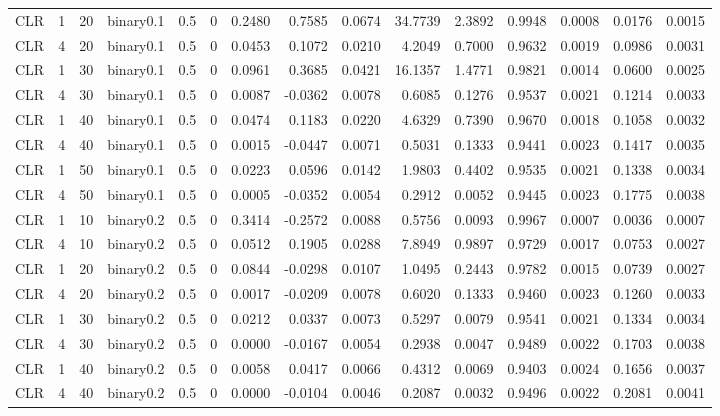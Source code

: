 \begin{longtable}{rrrrrrrrrrrrrrr}
  CLR & 1 & 20 & binary0.1 & 0.5 & 0 & 0.2480 & 0.7585 & 0.0674 & 34.7739 & 2.3892 & 0.9948 & 0.0008 & 0.0176 & 0.0015 \\ 
  CLR & 4 & 20 & binary0.1 & 0.5 & 0 & 0.0453 & 0.1072 & 0.0210 & 4.2049 & 0.7000 & 0.9632 & 0.0019 & 0.0986 & 0.0031 \\ 
  CLR & 1 & 30 & binary0.1 & 0.5 & 0 & 0.0961 & 0.3685 & 0.0421 & 16.1357 & 1.4771 & 0.9821 & 0.0014 & 0.0600 & 0.0025 \\ 
  CLR & 4 & 30 & binary0.1 & 0.5 & 0 & 0.0087 & -0.0362 & 0.0078 & 0.6085 & 0.1276 & 0.9537 & 0.0021 & 0.1214 & 0.0033 \\ 
  CLR & 1 & 40 & binary0.1 & 0.5 & 0 & 0.0474 & 0.1183 & 0.0220 & 4.6329 & 0.7390 & 0.9670 & 0.0018 & 0.1058 & 0.0032 \\ 
  CLR & 4 & 40 & binary0.1 & 0.5 & 0 & 0.0015 & -0.0447 & 0.0071 & 0.5031 & 0.1333 & 0.9441 & 0.0023 & 0.1417 & 0.0035 \\ 
  CLR & 1 & 50 & binary0.1 & 0.5 & 0 & 0.0223 & 0.0596 & 0.0142 & 1.9803 & 0.4402 & 0.9535 & 0.0021 & 0.1338 & 0.0034 \\ 
  CLR & 4 & 50 & binary0.1 & 0.5 & 0 & 0.0005 & -0.0352 & 0.0054 & 0.2912 & 0.0052 & 0.9445 & 0.0023 & 0.1775 & 0.0038 \\ 
  CLR & 1 & 10 & binary0.2 & 0.5 & 0 & 0.3414 & -0.2572 & 0.0088 & 0.5756 & 0.0093 & 0.9967 & 0.0007 & 0.0036 & 0.0007 \\ 
  CLR & 4 & 10 & binary0.2 & 0.5 & 0 & 0.0512 & 0.1905 & 0.0288 & 7.8949 & 0.9897 & 0.9729 & 0.0017 & 0.0753 & 0.0027 \\ 
  CLR & 1 & 20 & binary0.2 & 0.5 & 0 & 0.0844 & -0.0298 & 0.0107 & 1.0495 & 0.2443 & 0.9782 & 0.0015 & 0.0739 & 0.0027 \\ 
  CLR & 4 & 20 & binary0.2 & 0.5 & 0 & 0.0017 & -0.0209 & 0.0078 & 0.6020 & 0.1333 & 0.9460 & 0.0023 & 0.1260 & 0.0033 \\ 
  CLR & 1 & 30 & binary0.2 & 0.5 & 0 & 0.0212 & 0.0337 & 0.0073 & 0.5297 & 0.0079 & 0.9541 & 0.0021 & 0.1334 & 0.0034 \\ 
  CLR & 4 & 30 & binary0.2 & 0.5 & 0 & 0.0000 & -0.0167 & 0.0054 & 0.2938 & 0.0047 & 0.9489 & 0.0022 & 0.1703 & 0.0038 \\ 
  CLR & 1 & 40 & binary0.2 & 0.5 & 0 & 0.0058 & 0.0417 & 0.0066 & 0.4312 & 0.0069 & 0.9403 & 0.0024 & 0.1656 & 0.0037 \\ 
  CLR & 4 & 40 & binary0.2 & 0.5 & 0 & 0.0000 & -0.0104 & 0.0046 & 0.2087 & 0.0032 & 0.9496 & 0.0022 & 0.2081 & 0.0041 \\ 

\end{longtable}
